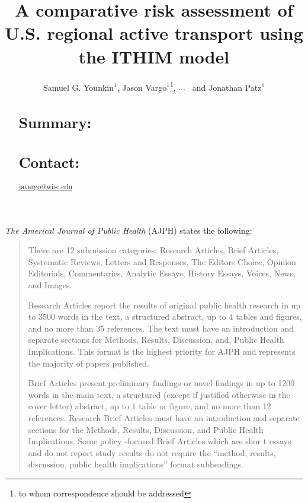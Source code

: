 \documentclass{bioinfo}
\begin{document}

\title[]{A comparative risk assessment of U.S. regional active
  transport using the ITHIM model}
\author[Younkin \textit{et~al}]{Samuel G. Younkin$^{1}$,
  Jason Vargo$^{1}$\footnote{to whom correspondence should be addressed},
  $\ldots$
  \ and Jonathan Patz$^{1}$}
\address{$^{1}$Global Health Institute\\
University of Wisconsin{\textendash}Madison, Madison, WI USA\\
}


\maketitle

\begin{abstract}

\section{Summary:}

\section{Contact:}
\href{javargo@wisc.edu}{javargo@wisc.edu}

\end{abstract}

\textit{The Americal Journal of Public Health} (AJPH) states the following:

\begin{quote}
There are 12 submission categories: Research Articles, Brief
Articles, Systematic Reviews, Letters and Responses, The Editors
Choice, Opinion Editorials, Commentaries, Analytic Essays, History
Essays, Voices, News, and Images.

Research Articles report the results of original public health
research in up to 3500 words in the text, a structured abstract, up to
4 tables and figures, and no more than 35 references. The text must
have an introduction and separate sections for Methods, Results,
Discussion, and, Public Health Implications. This format is the
highest priority for AJPH and represents the majority of papers
published.

Brief Articles present preliminary findings or novel findings in up to
1200 words in the main text, a structured (except if justified
otherwise in the cover letter) abstract, up to 1 table or figure, and
no more than 12 references.  Research Brief Articles must have an
introduction and separate sections for the Methods, Results,
Discussion, and Public Health Implications. Some policy -focused Brief
Articles which are shor t essays and do not report study results do
not require the “method, results, discussion, public health
implications” format subheadings.
\end{quote}
\end{document}
